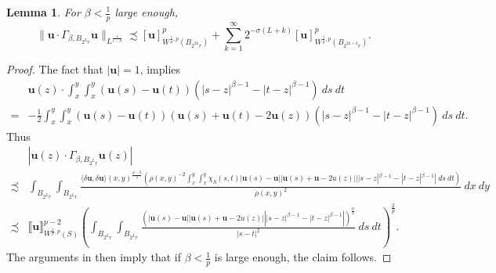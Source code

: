 \documentclass[a4paper,10pt,intlimits,ngerman]{amsart}
\newcommand{\iv}{B} %
\newtheorem{lemma}[theorem]{Lemma}
\numberwithin{equation}{section}
\newcommand{\solu}{{\boldsymbol{u}}}
\newcommand{\aleq}{\precsim}
\newcommand{\brac}[1]{\left ( #1 \right )}
\newcommand{\dmv}[2]{\langle \delta #1, \delta #2\rangle}
\begin{document}
\begin{lemma}\label{la:ucdotGamma}
For $\beta<\frac{1}{p}$ large enough,
\[
 \|\solu \cdot \Gamma_{\beta,\iv_{2^L r}}\solu\|_{L^{\frac{1}{1-\beta}}} \aleq [\solu]_{W^{\frac{1}{p},p}(\iv_{2^{2L}r})}^{p} + \sum_{k=1}^\infty 2^{-\sigma (L+k)}[\solu]_{W^{\frac{1}{p},p}(\iv_{2^{2L+k}r})}^{p}.
\]
\end{lemma}
\begin{proof}
The fact that $|\solu| = 1$, implies
\[
\begin{split}
 &\solu(z)\cdot \int_x^y \int_x^y (\solu(s)-\solu(t)) (|s-z|^{\beta-1} - |t-z|^{\beta-1})\ ds\ dt\\
 =&-\frac{1}{2}\int_x^y \int_x^y (\solu(s)-\solu(t))(\solu(s)+\solu(t)-2\solu(z)) (|s-z|^{\beta-1} - |t-z|^{\beta-1})\ ds\ dt.
\end{split}
 \]
Thus
\[
\begin{split}
 &|\solu(z) \cdot \Gamma_{\beta,\iv_{2^L r}}\solu(z)|\\
 \aleq &\int_{\iv_{2^L r}} \int_{\iv_{2^L r}} \frac{\dmv{\solu}{\solu}(x,y)^{\frac{p-2}{2}} \brac{\rho(x,y)^{-2} \int_x^y \int_x^y \chi_S(s,t) |\solu(s)-\solu||\solu(s)+\solu-2u(z)| ||s-z|^{\beta-1} - |t-z|^{\beta-1}|\ ds\ dt}}{\rho(x,y)^{2}}\ dx\ dy\\
\aleq &\llbracket \solu \rrbracket_{W^{\frac{1}{p},p}(S)}^{p-2} \brac{\int_{\iv_{2^L r}} \int_{\iv_{2^L r}} \frac{\brac{|\solu(s)-\solu||\solu(s)+\solu-2u(z)| \left ||s-z|^{\beta-1} - |t-z|^{\beta-1} \right |}^{\frac{p}{2}}}{|s-t|^{2}}\ ds\ dt}^{\frac{2}{p}}.
\end{split}
 \]
The arguments in \cite[Lemma 6.5]{SchikorraCPDE14} then imply that if $\beta < \frac{1}{p}$ is large enough, the claim follows.
\end{proof}
\end{document}
